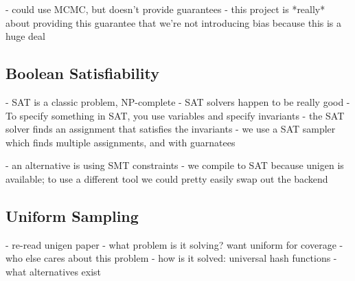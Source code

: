 - could use MCMC, but doesn't provide guarantees
- this project is *really* about providing this guarantee that we're not introducing bias because this is a huge deal

\subsection{Boolean Satisfiability}

- SAT is a classic problem, NP-complete
- SAT solvers happen to be really good
- To specify something in SAT, you use variables and specify invariants
- the SAT solver finds an assignment that satisfies the invariants
- we use a SAT sampler which finds multiple assignments, and with guarnatees

- an alternative is using SMT constraints
- we compile to SAT because unigen is available; to use a different tool we could pretty easily swap out the backend


\subsection{Uniform Sampling}

- re-read unigen paper
- what problem is it solving? want uniform for coverage
- who else cares about this problem
- how is it solved: universal hash functions
- what alternatives exist
